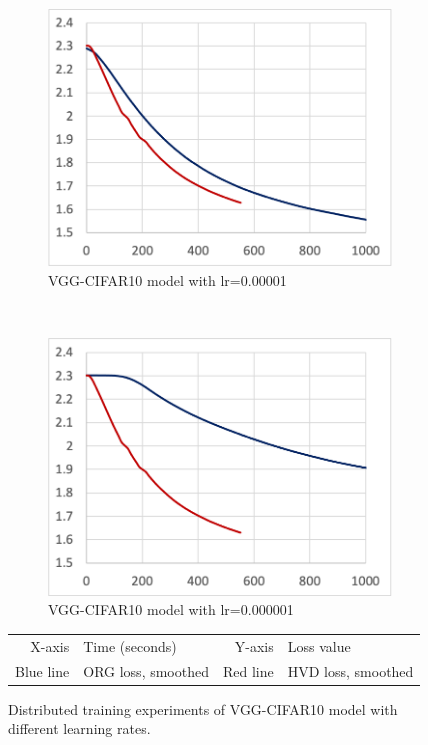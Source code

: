 \begin{figure}[!ht]
\begin{subfigure}[t]{.24\textwidth}
    \includegraphics[width=\textwidth]{cifar-1e5}
    \caption{VGG-CIFAR10 model with lr=0.00001}
  \end{subfigure}
  ~
  \begin{subfigure}[t]{.24\textwidth}
    \includegraphics[width=\textwidth]{cifar-1e6}
    \caption{VGG-CIFAR10 model with lr=0.000001}
  \end{subfigure}

  \caption{Distributed training experiments of VGG-CIFAR10 model with different learning rates.}
  \begin{tabular}{r@{: }l r@{: }l}
    X-axis & Time (seconds) & Y-axis & Loss value\\
    Blue line & ORG loss, smoothed & Red line & HVD loss, smoothed\\ 
  \end{tabular}
  \label{fig:eval:cifar10}
\end{figure}

